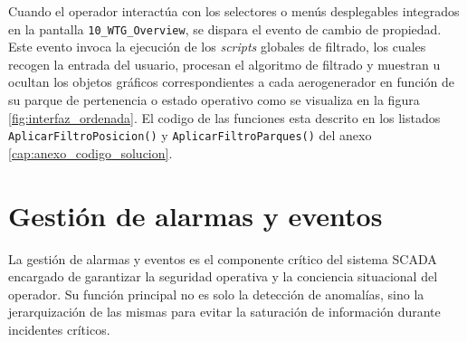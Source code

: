 \begin{table}[tb]
    \centering
    \caption{Lógica operativa de ejecución para las funciones globales de filtrado.}
    \label{tab:funciones_globales_filtrado}
\end{table}
Cuando el operador interactúa con los selectores o menús desplegables integrados en la pantalla \texttt{10\_WTG\_Overview}, se dispara el evento de cambio de propiedad. Este evento invoca la ejecución de los \textit{scripts} globales de filtrado, los cuales recogen la entrada del usuario, procesan el algoritmo de filtrado y muestran u ocultan los objetos gráficos correspondientes a cada aerogenerador en función de su parque de pertenencia o estado operativo como se visualiza en la figura \ref{fig:interfaz_ordenada}. El codigo de las funciones esta descrito en los listados \texttt{AplicarFiltroPosicion()} y \texttt{AplicarFiltroParques()} del anexo \ref{cap:anexo_codigo_solucion}.


\FloatBarrier
\section{Gestión de alarmas y eventos}
\label{sec:alarmas}

La gestión de alarmas y eventos es el componente crítico del sistema SCADA encargado de garantizar la seguridad operativa y la conciencia situacional del operador. Su función principal no es solo la detección de anomalías, sino la jerarquización de las mismas para evitar la saturación de información durante incidentes críticos. 

